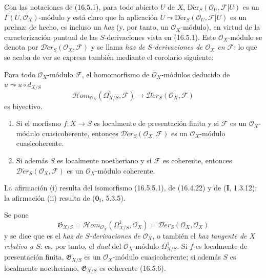 \begin{env}[16.5.4]
\label{IV.16.5.4}
Con las notaciones de (16.5.1), para todo abierto $U$ de $X$,
$\operatorname{D\acute{e}r}_S(\mathcal{O}_U,\mathscr{F}|U)$ es un
$\Gamma(U,\mathcal{O}_X)$-módulo y está claro que la aplicación
$U\leadsto\operatorname{D\acute{e}r}_S(\mathcal{O}_U,\mathscr{F}|U)$ es un
prehaz; de hecho, es incluso un \emph{haz} (y, por tanto, un
$\mathcal{O}_X$-módulo), en virtud de la caracterización puntual de las
$S$-derivaciones vista en (16.5.1). Este $\mathcal{O}_X$-módulo se denota por
$\mathscr{D}\!\acute{e}r_S(\mathcal{O}_X,\mathscr{F})$ y se llama
\emph{haz de $S$-derivaciones de $\mathcal{O}_X$ en $\mathscr{F}$}; lo
que se acaba de ver se expresa también mediante el corolario siguiente:
\end{env}

\begin{corollary}[16.5.5]
\label{IV.16.5.5}
Para todo $\mathcal{O}_X$-módulo $\mathscr{F}$, el homomorfismo de
$\mathcal{O}_X$-módulos deducido de $u\leadsto u\circ d_{X/S}$
\[
  \mathscr{H}\!om_{\mathcal{O}_X}(\varOmega_{X/S}^1,\mathscr{F})
  \longrightarrow
  \mathscr{D}\!\acute{e}r_S(\mathcal{O}_X,\mathscr{F})
  \tag{16.5.5.1}
  \label{IV.16.5.5.1}
\]
es biyectivo.
\end{corollary}

\begin{corollary}[16.5.6]
\label{IV.16.5.6}
\begin{enumerate}
\item[\textup{(i)}] Si el morfismo $f:X\to S$ es localmente de presentación finita y
si $\mathscr{F}$ es un $\mathcal{O}_X$-módulo cuasicoherente, entonces
$\mathscr{D}\!\acute{e}r_S(\mathcal{O}_X,\mathscr{F})$ es un
$\mathcal{O}_X$-módulo cuasicoherente.
\item[\textup{(ii)}] Si además $S$ es localmente noetheriano y si $\mathscr{F}$ es
coherente, entonces $\mathscr{D}\!\acute{e}r_S(\mathcal{O}_X,\mathscr{F})$ es un
$\mathcal{O}_X$-módulo coherente.
\end{enumerate}
\end{corollary}

La afirmación (i) resulta del isomorfismo (16.5.5.1), de (16.4.22) y de
(\textbf I, 1.3.12); la afirmación (ii) resulta de ($\mathbf{0}_{\mathrm I}$, 5.3.5).

\begin{env}[16.5.7]
\label{IV.16.5.7}
Se pone
\[
  \mathfrak{G}_{X/S}=
  \mathscr{H}\!om_{\mathcal{O}_X}(\varOmega_{X/S}^1,\mathcal{O}_X)
  =\mathscr{D}\!\acute{e}r_S(\mathcal{O}_X,\mathcal{O}_X)
  \tag{16.5.7.1}
  \label{IV.16.5.7.1}
\]
y se dice que es el \emph{haz de $S$-derivaciones de
$\mathcal{O}_X$}, o también el \emph{haz tangente de $X$ relativo a
$S$}: es, por tanto, el \emph{dual} del $\mathcal{O}_X$-módulo
$\varOmega_{X/S}^1$. Si $f$ es localmente de presentación
finita, $\mathfrak{G}_{X/S}$ es un $\mathcal{O}_X$-módulo cuasicoherente; si
además $S$ es localmente noetheriano, $\mathfrak{G}_{X/S}$ es coherente
(16.5.6).
\end{env}

